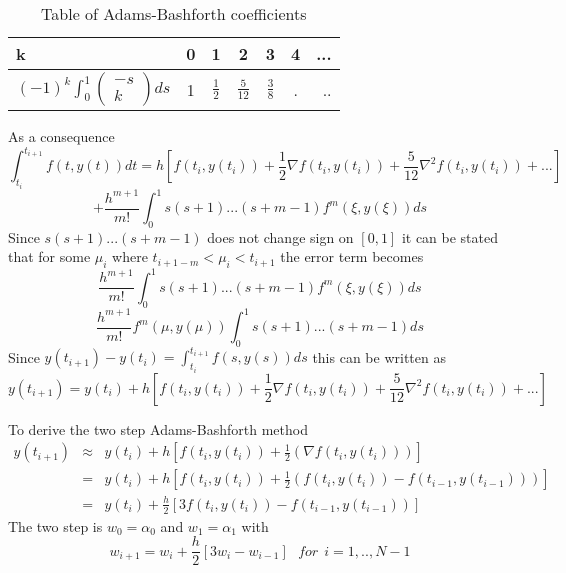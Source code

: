 \begin{table}[H]
\begin{center}
\caption{Table of Adams-Bashforth coefficients}
\begin{tabular}{l|c|c|c|c|c|r}
\hline
k&0&1&2&3&4&...\\
\hline
$(-1)^k\int_{0}^{1}\left(\begin{array}{c}-s \\ k \end{array}\right)ds$& 1 & $\frac{1}{2}$ &$ \frac{5}{12}$ & $\frac{3}{8}$ & .&..
\end{tabular}
\end{center}
\end{table}
As a consequence
\[ \int_{t_i}^{t_{i+1}} f(t,y(t)) dt= h\left[ f(t_i,y(t_i))+\frac{1}{2}\nabla f(t_i,y(t_i))+\frac{5}{12}\nabla^{2} f(t_i,y(t_i))+...\right]\]
\[
+\frac{h^{m+1}}{m!}\int_{0}^{1}s(s+1)...(s+m-1)f^{m}(\xi,y(\xi))ds
\]
Since $s(s+1)...(s+m-1)$ does not change sign on $[0,1]$ it can be stated that for some $\mu_i$ where $t_{i+1-m} < \mu_i < t_{i+1}$ the error term becomes
\[
\frac{h^{m+1}}{m!}\int_{0}^{1}s(s+1)...(s+m-1)f^{m}(\xi,y(\xi))ds
\]
\[
\frac{h^{m+1}}{m!}f^{m}(\mu,y(\mu))\int_{0}^{1}s(s+1)...(s+m-1)ds
\]
Since $y(t_{i+1})-y(t_i)=\int_{t_{i}}^{t_{i+1}}f(s,y(s))ds $ this can be written as
\[y(t_{i+1})=y(t_{i})+h\left[ f(t_i,y(t_i))+\frac{1}{2}\nabla f(t_i,y(t_i))+\frac{5}{12}\nabla^{2} f(t_i,y(t_i))+...\right]\]

\begin{example}
To derive the two step Adams-Bashforth method
\begin{eqnarray*}
y(t_{i+1}) &\approx &y(t_i)+ h[f(t_i,y(t_i))+\frac{1}{2}(\nabla f(t_i,y(t_i)))] \\
&=&y(t_i)+ h[f(t_i,y(t_i))+\frac{1}{2}(f(t_i,y(t_i))-f(t_{i-1},y(t_{i-1})))]\\
&=&y(t_i)+ \frac{h}{2}[3f(t_i,y(t_i))-f(t_{i-1},y(t_{i-1}))]
\end{eqnarray*}
The two step  is $w_0=\alpha_0$ and $w_1=\alpha_1$ with
\[w_{i+1}=w_i+\frac{h}{2}[3w_{i}-w_{i-1}] \ \ \ for \ \ i=1,..,N-1 \]
\end{example}

